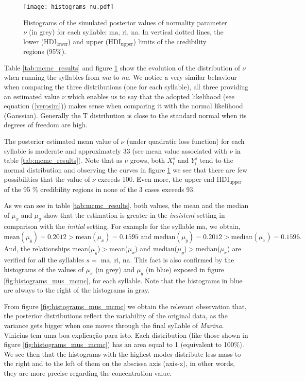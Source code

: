 \documentclass[11pt]{article}
\begin{document}
\begin{figure}[h!]
    \centering
    \texttt{[image: histograms\_nu.pdf]}
    \caption{Histograms of the simulated posterior values of normality parameter $\nu$ (in grey) for each syllable: ma, ri, na. In vertical dotted lines, the lower ($\mbox{HDI}_{\mbox{lower}}$) and upper ($\mbox{HDI}_{\mbox{upper}}$) limits of the credibility regions (95\%).}
    \label{fig:histograms_nu_mcmc}
\end{figure}


Table \ref{tab:mcmc_results} and figure \ref{fig:histograms_nu_mcmc} show the evolution of the distribution of $\nu$ when running the syllables from {\it{ma}} to {\it{na}}. We notice a very similar behaviour when comparing the three distributions (one for each syllable), all three providing an estimated value $\nu$ which enables us to say that the adopted likelihood (see equation (\ref{verosim})) makes sense when comparing it with the normal likelihood (Gaussian). Generally the T distribution is close to the standard normal when its degrees of freedom are high. 

The posterior estimated mean value of $\nu$ (under quadratic loss function) for each syllable is moderate and approximately 33 (see mean value associated with $\nu$ in table \ref{tab:mcmc_results}). Note that as $\nu$ grows, both $X_i^s$ and $Y_i^s$ tend to the normal distribution and observing the curves in figure \ref{fig:histograms_nu_mcmc} we see that there are few possibilities that the value of $\nu$ exceeds 100. Even more, the upper end $\mbox{HDI}_{\mbox{upper}}$ of the 95 \% credibility regions in none of the 3 cases exceeds 93.

As we can see in table \ref{tab:mcmc_results}, both values, the mean and the median of $\mu_x$ and $\mu_y$ show that the estimation is greater in the {\it{insistent}} setting in comparison with the {\it{initial}} setting. For example for the syllable ma, we obtain, 
$\mbox{mean}(\mu_y)=0.2012>\mbox{mean}(\mu_x)=0.1595 \,\,\mbox{and}\,\, \mbox{median}(\mu_y)=0.2012>\mbox{median}(\mu_x)=0.1596.$ And, the relationships mean($\mu_y$)$>$mean($\mu_x$) and median($\mu_y$)$>$median($\mu_x$) are verified for all the syllables $s=$ ma, ri, na. 
This fact is also confirmed by the histograms of the values of $\mu_x$ (in grey) and $\mu_y$ (in blue) exposed in figure \ref{fig:histograms_mus_mcmc}, for each syllable. Note that the histograms in blue are always to the right of the histograms in gray. 

From figure \ref{fig:histograms_mus_mcmc} we obtain the relevant observation that, the posterior distributions reflect the variability of the original data, as the variance gets bigger when one moves through the final syllable of {\it{Marina}}. {\color{blue} Vinicius tem uma boa explica\c c\~{a}o para isto}. Each distribution (like those shown in figure \ref{fig:histograms_mus_mcmc}) has an area equal to 1 (equivalent to 100\%). We see then that the histograms with the highest modes distribute less mass to the right and to the left of them on the abscissa axis (axis-x), in other words, they are more precise regarding the concentration value. 
\end{document}

